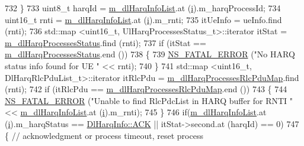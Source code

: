 \begin{DoxyCode}
732                         \}
733                         uint8\_t harqId = \hyperlink{classns3_1_1MmWaveFlexTtiMacScheduler_af30d399e8abceedfe762a84ea26336b6}{m\_dlHarqInfoList}.at (\hyperlink{bernuolliDistribution_8m_a6f6ccfcf58b31cb6412107d9d5281426}{i}).m\_harqProcessId;
734                         uint16\_t rnti = \hyperlink{classns3_1_1MmWaveFlexTtiMacScheduler_af30d399e8abceedfe762a84ea26336b6}{m\_dlHarqInfoList}.at (\hyperlink{bernuolliDistribution_8m_a6f6ccfcf58b31cb6412107d9d5281426}{i}).m\_rnti;
735                         itUeInfo = ueInfo.find (rnti);
736                         std::map <uint16\_t, UlHarqProcessesStatus\_t>::iterator itStat = 
      \hyperlink{classns3_1_1MmWaveFlexTtiMacScheduler_a7ea48669590368853d16240acf7dbebe}{m\_dlHarqProcessesStatus}.find (rnti);
737                         \textcolor{keywordflow}{if} (itStat == \hyperlink{classns3_1_1MmWaveFlexTtiMacScheduler_a7ea48669590368853d16240acf7dbebe}{m\_dlHarqProcessesStatus}.end ())
738                         \{
739                                 \hyperlink{group__fatal_ga5131d5e3f75d7d4cbfd706ac456fdc85}{NS\_FATAL\_ERROR} (\textcolor{stringliteral}{"No HARQ status info found for UE "} << rnti);
740                         \}
741                         std::map <uint16\_t, DlHarqRlcPduList\_t>::iterator itRlcPdu =  
      \hyperlink{classns3_1_1MmWaveFlexTtiMacScheduler_a7b37cf0428128dbfe578cd3c5d3ffbe9}{m\_dlHarqProcessesRlcPduMap}.find (rnti);
742                         \textcolor{keywordflow}{if} (itRlcPdu == \hyperlink{classns3_1_1MmWaveFlexTtiMacScheduler_a7b37cf0428128dbfe578cd3c5d3ffbe9}{m\_dlHarqProcessesRlcPduMap}.end ())
743                         \{
744                                 \hyperlink{group__fatal_ga5131d5e3f75d7d4cbfd706ac456fdc85}{NS\_FATAL\_ERROR} (\textcolor{stringliteral}{"Unable to find RlcPdcList in HARQ buffer for
       RNTI "} << \hyperlink{classns3_1_1MmWaveFlexTtiMacScheduler_af30d399e8abceedfe762a84ea26336b6}{m\_dlHarqInfoList}.at (\hyperlink{bernuolliDistribution_8m_a6f6ccfcf58b31cb6412107d9d5281426}{i}).m\_rnti);
745                         \}
746                         \textcolor{keywordflow}{if}(\hyperlink{classns3_1_1MmWaveFlexTtiMacScheduler_af30d399e8abceedfe762a84ea26336b6}{m\_dlHarqInfoList}.at (\hyperlink{bernuolliDistribution_8m_a6f6ccfcf58b31cb6412107d9d5281426}{i}).m\_harqStatus == 
      \hyperlink{structns3_1_1DlHarqInfo_a922d2bc13ae01f93cde1a8b4bfccad14a8d3ab99ad8902cfbc5929336966de3ef}{DlHarqInfo::ACK} || itStat->second.at (harqId) == 0)
747                         \{ \textcolor{comment}{// acknowledgment or process timeout, reset process}

\end{DoxyCode}
